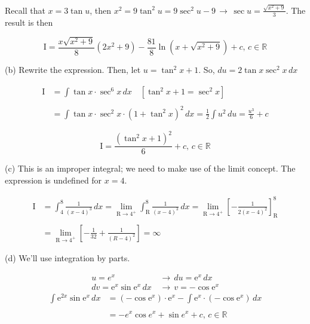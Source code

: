 \documentclass{article}
\begin{document}
\hfill

\noindent Recall that $x=3\tan u$, then $\displaystyle x^2 = 9\tan^2u = 9\sec^2u-9\,\rightarrow\, \sec u =\frac{\sqrt{x^2+9}}3$. The result is then

\begin{equation*}
\boxed{\mathrm{I}=\frac{x\sqrt{x^2+9}}8\left(2x^2+9\right)-\frac{81}8\ln(x+\sqrt{x^2+9}) + c,\,c\in\mathbb{R}}
\end{equation*}

\hfill

\noindent (b) Rewrite the expression. Then, let $u =\tan^2x + 1$. So, $du=2\tan x \sec^2 x\,dx$

\begin{align*}
\mathrm{I} &=\int\tan x \cdot\sec^6 x\, dx \quad\left[\tan^2x+1=\sec^2x\right] \\\\ &= \int\tan x\cdot\sec^2x\cdot(1+\tan^2x)^2 \,dx=\frac12\int u^2 \,du  = \frac{u^3}6 + c
\end{align*}

\begin{equation*}
\boxed{\mathrm{I}=\frac{(\tan^2x+1)^2}{6} + c, \, c\in \mathbb{R}}
\end{equation*}

\noindent (c) This is an improper integral; we need to make use of the limit concept. The expression is undefined for $x=4$.

\begin{align*}
\mathrm{I} &= \int_4^8\frac1{(x-4)^3}\,dx = \lim_{\mathrm{R}\to4^+}\int_\mathrm{R}^8\frac1{(x-4)^3}\,dx=\lim_{\mathrm{R}\to4^+} \left[-\frac1{2(x-4)^2}\right]_\mathrm{R}^8\\\\&=\lim_{\mathrm{R}\to4^+} \left[-\frac1{32} + \frac1{(R-4)^2}\right]=\boxed\infty
\end{align*}

\hfill

\noindent (d) We'll use integration by parts.

\begin{align*}u=e^x\,&\rightarrow\,du=\mathrm{e}^x\,dx \\dv=\mathrm{e}^x\sin \mathrm{e}^x \,dx \,&\rightarrow\,v=-\cos\mathrm{e}^x\end{align*}
\begin{align*}\int\mathrm{e}^{2x}\sin\mathrm{e}^x\,dx&=(-\cos\mathrm{e}^x)\cdot\mathrm{e}^x-\int\mathrm{e}^x\cdot(-\cos\mathrm{e}^x)\,dx\\\\&=\boxed{-e^x\cos e^x +\sin e^x + c, \,c \in \mathbb{R}} \end{align*}
\end{document}

